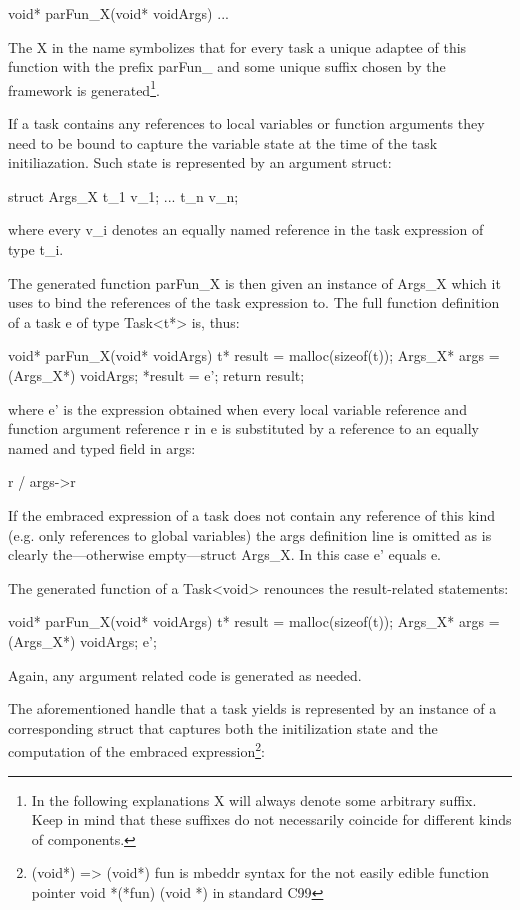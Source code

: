 void* parFun\_X(void* voidArgs) {...}

The X in the name symbolizes that for every task a unique adaptee of this function with the prefix parFun\_ and some unique suffix chosen by the framework is generated\footnote{In the following explanations X will always denote some arbitrary suffix. Keep in mind that these suffixes do not necessarily coincide for different kinds of components.}.

If a task contains any references to local variables or function arguments they need to be bound to capture the variable state at the time of the task initiliazation. Such state is represented by an argument struct:

struct Args\_X {
  t\_1 v\_1;
  ...
  t\_n v\_n;
}

where every v\_i denotes an equally named reference in the task expression of type t\_i.

The generated function parFun\_X is then given an instance of Args\_X which it uses to bind the references of the task expression to. The full function definition of a task e of type Task<t*> is, thus:

void* parFun\_X(void* voidArgs) {
  t* result = malloc(sizeof(t));
  Args\_X* args = (Args\_X*) voidArgs;
  *result = e';
  return result;
}

where e' is the expression obtained when every local variable reference and function argument reference r in e is substituted by a reference to an equally named and typed field in args:

r / args->r

If the embraced expression of a task does not contain any reference of this kind (e.g. only references to global variables) the args definition line is omitted as is clearly the---otherwise empty---struct Args\_X. In this case e' equals e.

The generated function of a Task<void> renounces the result-related statements:

void* parFun\_X(void* voidArgs) {
  t* result = malloc(sizeof(t));
  Args\_X* args = (Args\_X*) voidArgs;
  e';
}

Again, any argument related code is generated as needed.

The aforementioned handle that a task yields is represented by an instance of a corresponding struct that captures both the initilization state and the computation of the embraced expression\footnote{(void*) => (void*) fun is mbeddr syntax for the not easily edible function pointer void *(*fun) (void *) in standard C99}:

